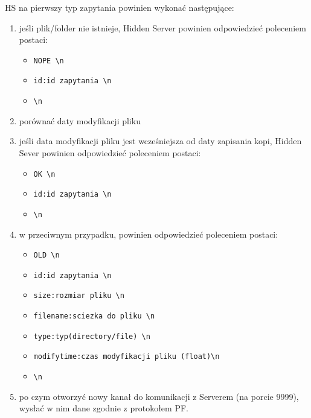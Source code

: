 \documentclass[a4paper,notitlepage]{article}
\begin{document}
HS na pierwszy typ zapytania powinien wykonać następujące:
\begin{enumerate}
    \item jeśli plik/folder nie istnieje, Hidden Server powinien odpowiedzieć poleceniem postaci:
    \begin{itemize}   
        \item \texttt{NOPE \textbackslash n}
        \item \texttt{id:id zapytania \textbackslash n}
        \item \texttt{\textbackslash n}
    \end{itemize}
    \item porównać daty modyfikacji pliku 
    \item jeśli data modyfikacji pliku jest wcześniejsza od daty zapisania kopi, Hidden Sever powinien odpowiedzieć poleceniem postaci:
    \begin{itemize}
        \item \texttt{OK \textbackslash n}
        \item \texttt{id:id zapytania \textbackslash n}
        \item \texttt{\textbackslash n}
    \end{itemize}
    \item w przeciwnym przypadku, powinien odpowiedzieć poleceniem postaci:
    \begin{itemize}
        \item \texttt{OLD \textbackslash n}
        \item \texttt{id:id zapytania \textbackslash n}
        \item \texttt{size:rozmiar pliku \textbackslash n}
        \item \texttt{filename:sciezka do pliku \textbackslash n}
        \item \texttt{type:typ(directory/file) \textbackslash n}
        \item \texttt{modifytime:czas modyfikacji pliku (float)\textbackslash n}
        \item \texttt{\textbackslash n}
    \end{itemize}
    \item po czym otworzyć nowy kanał do komunikacji z Serverem (na porcie 9999), wysłać w nim dane zgodnie z protokołem PF.
\end{enumerate}
\end{document}
